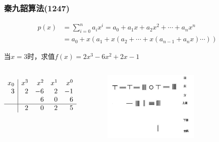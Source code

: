 \documentclass[red,compress]{beamer}
\begin{document}
\begin{frame}
\frametitle{秦九韶算法(1247)}

\begin{align*}
	p(x)&=\sum_{i=0}^{n}a_{i}x^i=a_0+a_1x+a_2x^2+\cdots+a_nx^n \\
	    &=a_0+x(a_1+x(a_2+\cdots+x(a_{n-1}+a_nx)\cdots))
\end{align*}

当$x=3$时，求值$f(x)=2x^3-6x^2+2x-1$
\begin{columns}[T]
\begin{equation*}
\begin{array}{r|*{4}r}
	x_0 & x^3 & x^2 & x^1 & x^0 \\
	3   & 2   & -6  & 2   & -1  \\
	    &     & 6   & 0   & 6   \\
     \hline
	    & 2 & 0 & 2& 5
\end{array}
\end{equation*}

\begin{figure}
\includegraphics[width=0.7\textwidth]{qinjiushao.jpg}
\end{figure}
\end{columns}
\end{frame}
\end{document}
